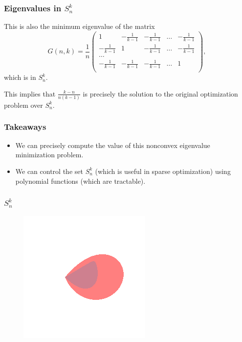 \documentclass{beamer}
\begin{document}
\begin{frame}
    \frametitle{Eigenvalues in $S^k_n$}
    This is also the minimum eigenvalue of the matrix
    \[
        G(n,k) = 
        \frac{1}{n}
        \begin{pmatrix}
            1 & -\frac{1}{k-1} & -\frac{1}{k-1}  &\dots& -\frac{1}{k-1}\\
            -\frac{1}{k-1} & 1 & -\frac{1}{k-1}  &\dots& -\frac{1}{k-1}\\
            \dots\\
            -\frac{1}{k-1} & -\frac{1}{k-1}& -\frac{1}{k-1}  &\dots & 1\\
        \end{pmatrix},
    \]
    which is in $S^k_n$.

    This implies that $\frac{k-n}{n(k-1)}$ is precisely the solution to the original optimization problem over $S^k_n$.
\end{frame}
\begin{frame}
    \frametitle{Takeaways}
    \begin{itemize}
        \item We can precisely compute the value of this nonconvex eigenvalue minimization problem.
        \item We can control the set $S^k_n$ (which is useful in sparse optimization) using polynomial functions (which are tractable).
    \end{itemize}
\end{frame}
\begin{frame}
    \frametitle{$S^k_n$}
    \begin{figure}[h]
        \centering
        \includegraphics[width=0.6\linewidth]{comparison.png}
    \end{figure}
\end{frame}
\end{document}
